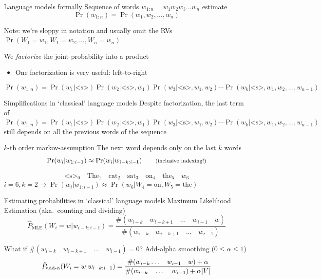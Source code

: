 \documentclass[12pt,aspectratio=169,handout]{beamer}
\begin{document}
\begin{frame}{Language models formally}
Sequence of words $w_{1:n} = w_1 w_2 w_3 \ldots w_n$ estimate
$$
\Pr(w_{1:n}) = \Pr(w_1, w_2, \ldots, w_n)
$$
\begin{block}{Note: we're sloppy in notation and usually omit the RVs}
$\Pr(W_1 = w_1, W_1 = w_2, \ldots, W_n = w_n)$
\end{block}

We \emph{factorize} the joint probability into a product
\begin{itemize}
	\item One factorization is very useful: left-to-right
\end{itemize}
$$
\Pr(w_{1:n}) = \Pr(w_1 | \text{<s>}) \Pr (w_2 | \text{<s>}, w_1) \Pr(w_3 | \text{<s>}, w_1, w_2) \cdots \Pr(w_k | \text{<s>}, w_1, w_2, \ldots, w_{n-1})
$$

\end{frame}

\begin{frame}{Simplifications in `classical' language models}
Despite factorization, the last term of
$
\Pr(w_{1:n}) = \Pr(w_1 | \text{<s>}) \Pr (w_2 | \text{<s>}, w_1) \Pr(w_3 | \text{<s>}, w_1, w_2) \cdots \Pr(w_k | \text{<s>}, w_1, w_2, \ldots, w_{n-1})
$
still depends on all the previous words of the sequence

\begin{block}{$k$-th order markov-assumption}
The next word depends only on the last $k$ words
$$
\Pr(w_{i} | w_{1:i-1}) \approx \Pr (w_{i} | w_{i-k:i-1}) \qquad \text{\footnotesize{(inclusive indexing!)}}
$$
\end{block}
\pause
$$
\text{<s>}_0 \quad \text{The}_1 \quad \text{cat}_2 \quad \text{sat}_3 \quad \text{on}_4 \quad \text{the}_5 \quad w_6
$$
$i = 6, k=2 \to \Pr(w_{i} | w_{1:i-1}) \approx \Pr(w_6 | W_4 = \text{on}, W_5 = \text{the})$
\end{frame}

\begin{frame}{Estimating probabilities in `classical' language models}
Maximum Likelihood Estimation (aka.\ counting and dividing)
$$
\hat{P}_{\text{MLE}}(W_i = w | w_{i - k:i - 1}) = \frac{\#(w_{i-k} \quad w_{i-k+1} \quad \ldots \quad w_{i-1} \quad w)}{\#(w_{i-k} \quad w_{i-k+1} \quad \ldots \quad w_{i-1})}
$$
\begin{block}{What if $\#(w_{i-k} \quad w_{i-k+1} \quad \ldots \quad w_{i-1}) = 0$?}
\pause
Add-alpha smoothing ($0 \leq \alpha \leq 1$)
$$
\hat{P}_{\text{add-}\alpha}(W_i = w | w_{i - k:i - 1}) =
\frac{\#(w_{i-k} \ldots \quad w_{i-1} \quad w) + \alpha}
{\#(w_{i-k} \quad \ldots \quad w_{i-1}) + \alpha \abs{V}}
$$
\end{block}

\end{frame}
\end{document}

